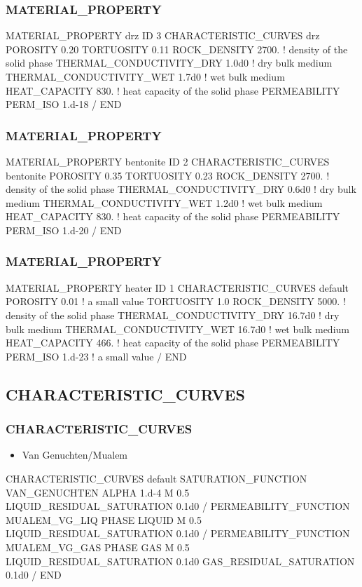 \documentclass{beamer}
\newcommand\bluecomment[1]{{{\color{blue} #1}}}
\begin{document}
\begin{frame}[fragile]\frametitle{MATERIAL\_PROPERTY}
\begin{semiverbatim}
MATERIAL_PROPERTY drz
  ID 3
  CHARACTERISTIC_CURVES drz
  POROSITY 0.20
  TORTUOSITY 0.11
  ROCK_DENSITY 2700. \bluecomment{! density of the solid phase}
  THERMAL_CONDUCTIVITY_DRY 1.0d0 \bluecomment{! dry bulk medium}
  THERMAL_CONDUCTIVITY_WET 1.7d0 \bluecomment{! wet bulk medium}
  HEAT_CAPACITY 830. \bluecomment{! heat capacity of the solid phase}
  PERMEABILITY
    PERM_ISO 1.d-18
  /
END
\end{semiverbatim}
\end{frame}

\begin{frame}[fragile]\frametitle{MATERIAL\_PROPERTY}
\begin{semiverbatim}
MATERIAL_PROPERTY bentonite
  ID 2
  CHARACTERISTIC_CURVES bentonite
  POROSITY 0.35
  TORTUOSITY 0.23
  ROCK_DENSITY 2700. \bluecomment{! density of the solid phase}
  THERMAL_CONDUCTIVITY_DRY 0.6d0 \bluecomment{! dry bulk medium}
  THERMAL_CONDUCTIVITY_WET 1.2d0 \bluecomment{! wet bulk medium}
  HEAT_CAPACITY 830. \bluecomment{! heat capacity of the solid phase}
  PERMEABILITY
    PERM_ISO 1.d-20
  /
END
\end{semiverbatim}
\end{frame}

\begin{frame}[fragile]\frametitle{MATERIAL\_PROPERTY}
\begin{semiverbatim}
MATERIAL_PROPERTY heater
  ID 1
  CHARACTERISTIC_CURVES default
  POROSITY 0.01 ! a small value
  TORTUOSITY 1.0
  ROCK_DENSITY 5000. \bluecomment{! density of the solid phase}
  THERMAL_CONDUCTIVITY_DRY 16.7d0 \bluecomment{! dry bulk medium}
  THERMAL_CONDUCTIVITY_WET 16.7d0 \bluecomment{! wet bulk medium}
  HEAT_CAPACITY 466. \bluecomment{! heat capacity of the solid phase}
  PERMEABILITY
    PERM_ISO 1.d-23 ! a small value
  /
END
\end{semiverbatim}
\end{frame}
\subsection{CHARACTERISTIC\_CURVES}

\begin{frame}\frametitle{CHARACTERISTIC\_CURVES}
\begin{itemize}
  \item Van Genuchten/Mualem
\end{itemize}
\begin{semiverbatim}\small
CHARACTERISTIC_CURVES default
  SATURATION_FUNCTION VAN_GENUCHTEN
    ALPHA 1.d-4
    M 0.5
    LIQUID_RESIDUAL_SATURATION 0.1d0
  /
  PERMEABILITY_FUNCTION MUALEM_VG_LIQ
    PHASE LIQUID
    M 0.5
    LIQUID_RESIDUAL_SATURATION 0.1d0
  /
  PERMEABILITY_FUNCTION MUALEM_VG_GAS
    PHASE GAS
    M 0.5
    LIQUID_RESIDUAL_SATURATION 0.1d0
    GAS_RESIDUAL_SATURATION 0.1d0
  /
END
\end{semiverbatim}
\end{frame}
\end{document}
